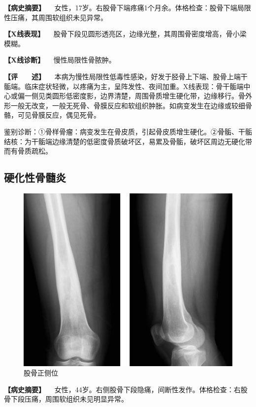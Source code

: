 \textbf{【病史摘要】}
　女性，17岁。右股骨下端疼痛1个月余。体格检查：股骨下端局限性压痛，其周围软组织未见异常。

\textbf{【X线表现】}
　股骨下段见圆形透亮区，边缘光整，其周围骨密度增高，骨小梁模糊。

\textbf{【X线诊断】} 　慢性局限性骨脓肿。

\textbf{【评　　述】}
　本病为慢性局限性低毒性感染，好发于胫骨上下端、股骨上端干骺端。临床症状轻微，以疼痛为主，呈阵发性、夜间加重。X线表现：骨干骺端中心或偏一侧见类圆形低密度影，边界清楚，周围骨质增生硬化带，边缘移行。骨外形一般无改变，一般无死骨、骨膜反应和软组织肿胀。如病变发生在边缘或较细骨骼，可见骨膜反应，偶见死骨。

鉴别诊断：①骨样骨瘤：病变发生在骨皮质，引起骨皮质增生硬化。②骨骺、干骺结核：为干骺端边缘清楚的低密度骨质破坏区，易累及骨骺，破坏区周边无硬化带而有骨质疏松。

\subsection{硬化性骨髓炎}

\begin{figure}[!htbp]
 \centering
 \includegraphics{./images/Image00074.jpg}
 \captionsetup{justification=centering}
 \caption{股骨正侧位}
 \label{fig2-5-4}
  \end{figure} 

\textbf{【病史摘要】}
　女性，44岁。右侧股骨下段隐痛，间断性发作。体格检查：右股骨下段压痛，周围软组织未见明显异常。

